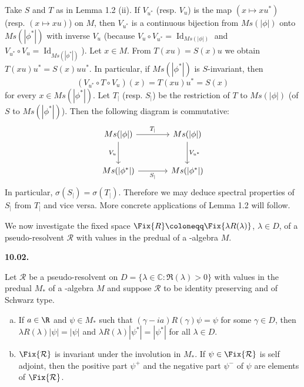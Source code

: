 \begin{remark}\label{rem:d3-1.3}
Take $S$ and $T$ as in Lemma 1.2 (ii).
If $V_{u^{*}}$ (resp. $V_u$) is the map $(x \mapsto xu^{*})$ (resp. $(x \mapsto xu)$) on $M$, then $V_{u^{*}}$ is a continuous bijection from $Ms(|\phi|)$ onto $Ms(|\phi^{*}|)$ with inverse $V_u$ (because $V_u \circ V_{u^{*}} = \operatorname{Id}_{Ms(|\phi|)}$ and $V_{u^{*}} \circ V_u = \operatorname{Id}_{Ms(|\phi^{*}|)}$).
Let $x \in M$.
From $T(xu) = S(x)u$ we obtain $T(xu)u^{*} = S(x)uu^{*}$.
In particular, if $Ms(|\phi^{*}|)$ is $S$-invariant, then
\[
	(V_{u^{*}} \circ T \circ V_u)(x) = T(xu)u^{*} = S(x)
\]
for every $x \in Ms(|\phi^{*}|)$.
Let $T_{|}$ (resp. $S_{|}$) be the restriction of $T$ to $Ms(|\phi|)$ (\resp of $S$ to $Ms(|\phi^{*}|)$).
Then the following diagram is commutative:
\begin{equation*}
\begin{tikzcd}[column sep=large, row sep=large, scale=1.5]
Ms(|\phi|) \arrow[r, "T_{|}"] \arrow[d, "V_u"'] & Ms(|\phi|) \arrow[d, "V_{u^{*}}"] \\
Ms(|\phi^{*}|) \arrow[r, "S_{|}"'] & Ms(|\phi^{*}|)
\end{tikzcd}
\end{equation*}
In particular, $\sigma(S_{|}) = \sigma(T_{|})$.
Therefore we may deduce spectral properties of $S_{|}$ from $T_{|}$ and vice versa.
More concrete applications of Lemma 1.2 will follow.
\end{remark}
We now investigate the fixed space $\Fix{R} \coloneqq \Fix{\lambda R(\lambda)}$, $\lambda \in D$, of a pseudo-resolvent $\mathcal{R}$ with values in the predual of a \WA-algebra $M$.

\textbf{10.02.} 

\newpage

\begin{proposition}\label{prop:d3-1.4}
Let $\mathcal{R}$ be a pseudo-resolvent on $D = \{\lambda \in \mathbb{C} \colon \Re(\lambda) > 0\}$ with values in the predual $M_*$ of a \WA-algebra $M$ and suppose $\mathcal{R}$ to be identity preserving and of Schwarz type.

\begin{enumerate}[(a)]
\item 
If $a \in \R$ and $\psi \in M_*$ such that $(\gamma - ia)R(\gamma)\psi = \psi$ for some $\gamma \in D$, then $\lambda R(\lambda)|\psi| = |\psi|$ and $\lambda R(\lambda)|\psi^{*}| = |\psi^{*}|$ for all $\lambda \in D$.

\item 
$ \Fix{\mathcal{R}} $ is invariant under the involution in $M_*$.
If $\psi \in \Fix{\mathcal{R}} $ is self adjoint, then the positive part $\psi^{+}$ and the negative part $\psi^{-}$ of $\psi$ are elements of $ \Fix{\mathcal{R}} $.
\end{enumerate}
\end{proposition}

